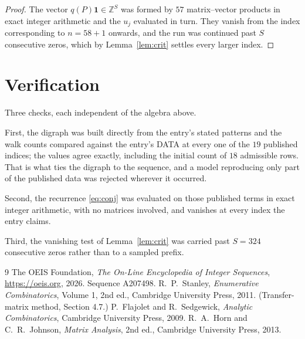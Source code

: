 \documentclass[11pt,a4paper]{article}
\theoremstyle{plain}
\theoremstyle{definition}
\begin{document}
\begin{proof}
The vector $q(P)\mathbf{1}\in\mathbb{Z}^{S}$ was formed by $57$ matrix--vector
products in exact integer arithmetic and the $u_j$ evaluated in turn. They vanish from the
index corresponding to $n=58+1$ onwards, and the run was continued past $S$ consecutive
zeros, which by Lemma~\ref{lem:crit} settles every larger index.
\end{proof}

\section{Verification}

Three checks, each independent of the algebra above.

First, the digraph was built directly from the entry's stated patterns and the walk counts
compared against the entry's DATA at every one of the $19$ published indices; the
values agree exactly, including the initial count of $18$ admissible rows. That is
what ties the digraph to the sequence, and a model reproducing only part of the published
data was rejected wherever it occurred.

Second, the recurrence \eqref{eq:conj} was evaluated on those published terms in exact
integer arithmetic, with no matrices involved, and vanishes at every index the entry claims.

Third, the vanishing test of Lemma~\ref{lem:crit} was carried past $S=324$ consecutive
zeros rather than to a sampled prefix.

\begin{thebibliography}{9}
 The OEIS Foundation, \emph{The On-Line Encyclopedia of Integer
Sequences}, \url{https://oeis.org}, 2026. Sequence A207498.
 R.~P.~Stanley, \emph{Enumerative Combinatorics}, Volume 1, 2nd ed.,
Cambridge University Press, 2011. (Transfer-matrix method, Section 4.7.)
 P.~Flajolet and R.~Sedgewick, \emph{Analytic Combinatorics}, Cambridge
University Press, 2009.
 R.~A.~Horn and C.~R.~Johnson, \emph{Matrix Analysis}, 2nd ed., Cambridge
University Press, 2013.
\end{thebibliography}
\end{document}
